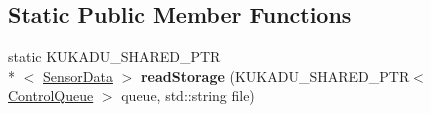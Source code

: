 \subsection*{Static Public Member Functions}
\begin{DoxyCompactItemize}
\item 
\hypertarget{classkukadu_1_1SensorStorage_a670a757897a4f1f0008b4f877dc8480e}{static K\-U\-K\-A\-D\-U\-\_\-\-S\-H\-A\-R\-E\-D\-\_\-\-P\-T\-R\\*
$<$ \hyperlink{classkukadu_1_1SensorData}{Sensor\-Data} $>$ {\bfseries read\-Storage} (K\-U\-K\-A\-D\-U\-\_\-\-S\-H\-A\-R\-E\-D\-\_\-\-P\-T\-R$<$ \hyperlink{classkukadu_1_1ControlQueue}{Control\-Queue} $>$ queue, std\-::string file)}\label{classkukadu_1_1SensorStorage_a670a757897a4f1f0008b4f877dc8480e}

\end{DoxyCompactItemize}
